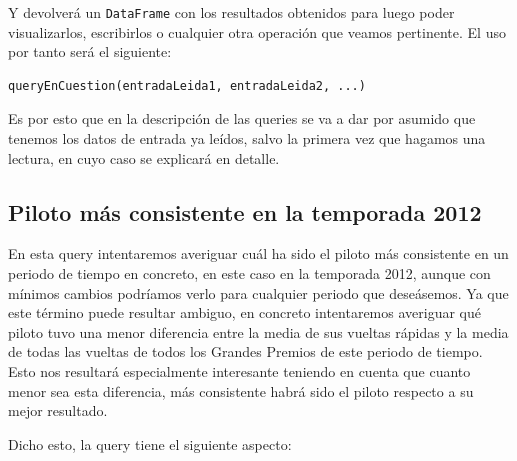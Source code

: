 \documentclass[12pt,twoside,titlepage]{report}
\begin{document}
Y devolverá un \texttt{DataFrame} con los resultados obtenidos para luego poder visualizarlos, escribirlos o cualquier otra operación que veamos pertinente. El uso por tanto será el siguiente:

\begin{lstlisting}
queryEnCuestion(entradaLeida1, entradaLeida2, ...)
\end{lstlisting}

Es por esto que en la descripción de las queries se va a dar por asumido que tenemos los datos de entrada ya leídos, salvo la primera vez que hagamos una lectura, en cuyo caso se explicará en detalle.

\subsection{Piloto más consistente en la temporada 2012}

En esta query intentaremos averiguar cuál ha sido el piloto más consistente en un periodo de tiempo en concreto, en este caso en la temporada 2012, aunque con mínimos cambios podríamos verlo para cualquier periodo que deseásemos. Ya que este término puede resultar ambiguo, en concreto intentaremos averiguar qué piloto tuvo una menor diferencia entre la media de sus vueltas rápidas y la media de todas las vueltas de todos los Grandes Premios de este periodo de tiempo. Esto nos resultará especialmente interesante teniendo en cuenta que cuanto menor sea esta diferencia, más consistente habrá sido el piloto respecto a su mejor resultado.

Dicho esto, la query tiene el siguiente aspecto:
\newpage
\end{document}
